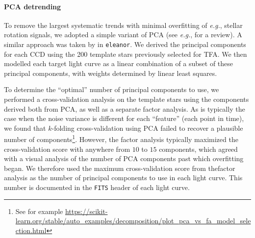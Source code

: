 \documentclass[12pt,twocolumn,tighten]{aastex62}
\begin{document}
\paragraph{PCA detrending}

To remove the largest systematic trends with minimal overfitting of
{\it e.g.}, stellar rotation signals, we adopted a simple variant of
PCA (see {\it e.g.}, \citealt{ivezic_statistics_2014} for a review).
A similar approach was taken by \citet{feinstein_eleanor_2019} in
\texttt{eleanor}.  We derived the principal components for each CCD
using the 200 template stars previously selected for TFA.  We then
modelled each target light curve as a linear combination of a subset
of these principal components, with weights determined by linear least
squares.

To determine the ``optimal'' number of principal components to use, we
performed a cross-validation analysis on the template stars using the
components derived both from PCA, as well as a separate factor
analysis.  As is typically the case when the noise variance is
different for each ``feature'' (each point in time), we found that
$k$-folding cross-validation using PCA failed to recover a plausible
number of components\footnote{See for example
\url{https://scikit-learn.org/stable/auto_examples/decomposition/plot_pca_vs_fa_model_selection.html}}.
However, the factor analysis typically maximized the cross-validation
score with anywhere from $10$ to $15$ components, which agreed with a
visual analysis of the number of PCA components past which overfitting
began.  We therefore used the maximum cross-validation score from
thefactor analysis as the number of principal components to use in
each light curve.  This number is documented in the \texttt{FITS}
header of each light curve.

% 
\end{document}
